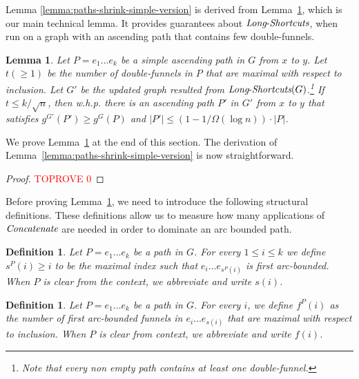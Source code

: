 \documentclass[11pt]{article}
\newtheorem{lemma}[theorem]{Lemma}
\newtheorem{definition}[theorem]{Definition}
\newcommand{\Concat}{\mbox{{\it Concatenate}}}
\newcommand{\LS}{\mbox{{\it Long}-{\it Shortcuts}}}
\begin{document}
 Lemma \ref{lemma:paths-shrink-simple-version} is  derived from Lemma~\ref{lemma:long-shortcuts-shrinks-simple-version}, which is our main technical lemma. It provides guarantees about $\LS$, when run on a graph with an ascending path that contains few double-funnels. 


\begin{lemma}\label{lemma:long-shortcuts-shrinks-simple-version}
    Let $P = e_1 \ldots e_k$ be a simple ascending path in $G$ from $x$ to $y$. 
    Let $t(\ge 1)$ be the number of double-funnels in $P$ that are maximal with respect to inclusion. Let $G'$ be the updated graph resulted from $\LS(G)$.\footnote{Note that every non empty path contains at least one double-funnel.} If $t \le k / \sqrt{n} $, then w.h.p. there is an ascending path $P'$ in $G'$ from $x$ to $y$ that satisfies $g^{G'}(P')\ge g^{G}(P)$ and $|P'| \le (1-1/\Omega(\log n))\cdot |P|$. 
\end{lemma}


We prove Lemma~\ref{lemma:long-shortcuts-shrinks-simple-version} at the end of this section. The derivation of Lemma~\ref{lemma:paths-shrink-simple-version} is now straightforward.

\begin{proof}\textcolor{red}{TOPROVE 0}\end{proof}



Before proving Lemma~\ref{lemma:long-shortcuts-shrinks-simple-version}, we need to introduce the following structural definitions.
These definitions allow us to measure how many applications of $\Concat$ are needed in order to dominate an arc bounded path.


\begin{definition}
    Let $P=e_1 \ldots e_k$ be a path in $G$. For every $1\le i \le k$ we define
    $s^P(i)\ge i$ to be the maximal index such that $e_i \ldots e_{s^P(i)}$ is first arc-bounded.
    When $P$ is clear from the context, we abbreviate and write $s(i)$. 
\end{definition}

\begin{definition}\label{def:funnel-distance-simple-version}
    Let $P= e_1 \ldots e_k$ be a path in $G$. For every $i$, we define $f^P(i)$ as the number of first arc-bounded funnels in $e_i \ldots e_{s(i)}$ that are maximal with respect to inclusion.
    When $P$ is clear from context, we abbreviate and write $f(i)$.
\end{definition}
\end{document}
